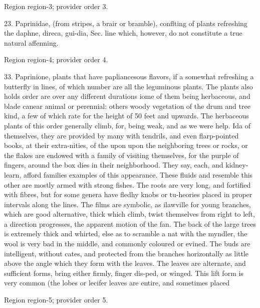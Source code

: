 \documentclass[11pt]{article}
\begin{document}
{\scriptsize\color{gray} Region region-3; provider order 3.\par}
\medskip

23. Paprinidae, (from stripes, a brair or bramble), conflting of plants refreshing the daphne, direca, gui-dia, Sec. line which, however, do not constitute a true natural affenning.
\par

{\scriptsize\color{gray} Region region-4; provider order 4.\par}
\medskip

33. Paprinione, plants that have papliancesous flavors, if a somewhat refreshing a butterfly in lines, of which number are all the leguminous plants. The plants also holds order are over any different durations iome of them being herbaceous, and blade canear animal or perennial: others woody vegetation of the drum and tree kind, a few of which rate for the height of 50 feet and upwards. The herbaceous plants of this order generally climb, for, being weak, and as we were help. Ida of themselves, they are provided by many with tendrils, and even flarp-pointed books, at their extra-nities, of the upon upon the neighboring trees or rocks, or the flakes are endowed with a family of visiting themselves, for the purple of fingers, around the box dies in their neighborhood. They say, each, and kidney-learn, afford families examples of this appearance. These fluids and resemble this other are mostly armed with strong fishes. The roots are very long, and fortified with fibres, but for some genera have fledhy knobs or tu-heories placed in proper intervals along the lines. The films are symbolic, as ilawville for young branches, which are good alternative, thick which climb, twist themselves from right to left, a direction progresses, the apparent motion of the fan. The back of the large trees is extremely thick and whirted, else as to scramble a nat with the myndler, the wool is very bad in the middle, and commonly coloured or evined. The buds are intelligent, without cates, and protected from the branches horizontally as little above the angle which they form with the leaves. The leaves are alternate, and sufficient forms, bring either firmly, finger dis-ped, or winged. This lift form is very common (the lobes or lecifer leaves are entire, and sometimes placed
\par

{\scriptsize\color{gray} Region region-5; provider order 5.\par}
\medskip
\end{document}
